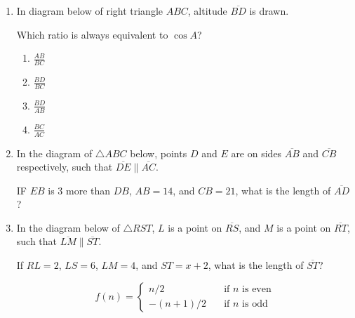 \documentclass[12pt, oneside]{article}
\begin{document}
\begin{enumerate}[itemsep=1.7cm]
\item In diagram below of right triangle $ABC$, altitude $\overline{BD}$ is drawn.
  \begin{center}
  \end{center}
Which ratio is always equivalent to $\cos A$?
\begin{multicols}{2}
  \begin{enumerate}
    \item $\displaystyle \frac{AB}{BC}$
    \item $\displaystyle \frac{BD}{BC}$ 
    \item $\displaystyle \frac{BD}{AB}$
    \item $\displaystyle \frac{BC}{AC}$
  \end{enumerate}
\end{multicols}

\item In the diagram of $\triangle ABC$ below, points $D$ and $E$ are on sides $\overline{AB}$ and $\overline{CB}$ respectively, such that $\overline{DE} \parallel \overline{AC}$.
\begin{center}
\end{center}
IF $EB$ is 3 more than $DB$, $AB=14$, and $CB=21$, what is the length of $\overline{AD}$?

\newpage
\item In the diagram below of $\triangle RST$, $L$ is a point on $\overline{RS}$, and $M$ is a point on $\overline{RT}$, such that $\overline{LM} \parallel \overline{ST}$.
\begin{center}
\end{center}
If $RL=2$, $LS=6$, $LM=4$, and $ST=x+2$, what is the length of $\overline{ST}$?

\newpage
\[ f(n) =
  \begin{cases}
    n/2       & \quad \text{if } n \text{ is even}\\
    -(n+1)/2  & \quad \text{if } n \text{ is odd}
  \end{cases}
\]

\end{enumerate}
\end{document}
